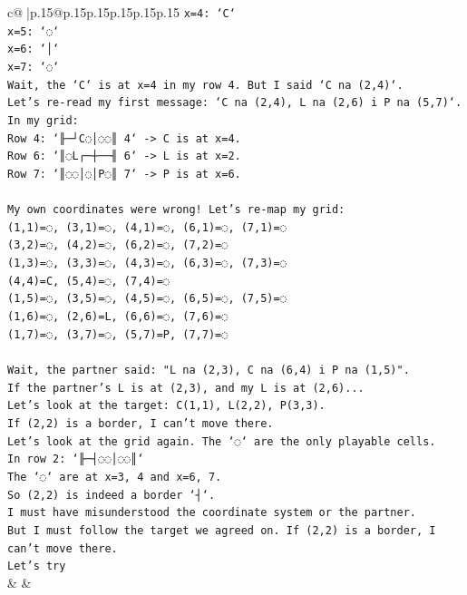 \documentclass{article}
\begin{document}
{\begin{supertabular}{c@{$\;$}|p{.15\linewidth}@{}p{.15\linewidth}p{.15\linewidth}p{.15\linewidth}p{.15\linewidth}p{.15\linewidth}}
{{{\texttt{x=4: `C`} \\
\texttt{x=5: `◌`} \\
\texttt{x=6: `│`} \\
\texttt{x=7: `◌`} \\
\texttt{Wait, the `C` is at x=4 in my row 4. But I said `C na (2,4)`.} \\
\texttt{Let's re{-}read my first message: `C na (2,4), L na (2,6) i P na (5,7)`.} \\
\texttt{In my grid:} \\
\texttt{Row 4: `╟─┘C◌│◌◌║ 4` {-}> C is at x=4.} \\
\texttt{Row 6: `║◌L┌─┼──╢ 6` {-}> L is at x=2.} \\
\texttt{Row 7: `║◌◌│◌│P◌║ 7` {-}> P is at x=6.} \\
\\ 
\texttt{My own coordinates were wrong! Let's re{-}map my grid:} \\
\texttt{(1,1)=◌, (3,1)=◌, (4,1)=◌, (6,1)=◌, (7,1)=◌} \\
\texttt{(3,2)=◌, (4,2)=◌, (6,2)=◌, (7,2)=◌} \\
\texttt{(1,3)=◌, (3,3)=◌, (4,3)=◌, (6,3)=◌, (7,3)=◌} \\
\texttt{(4,4)=C, (5,4)=◌, (7,4)=◌} \\
\texttt{(1,5)=◌, (3,5)=◌, (4,5)=◌, (6,5)=◌, (7,5)=◌} \\
\texttt{(1,6)=◌, (2,6)=L, (6,6)=◌, (7,6)=◌} \\
\texttt{(1,7)=◌, (3,7)=◌, (5,7)=P, (7,7)=◌} \\
\\ 
\texttt{Wait, the partner said: "L na (2,3), C na (6,4) i P na (1,5)".} \\
\texttt{If the partner's L is at (2,3), and my L is at (2,6)...} \\
\texttt{Let's look at the target: C(1,1), L(2,2), P(3,3).} \\
\texttt{If (2,2) is a border, I can't move there.} \\
\texttt{Let's look at the grid again. The `◌` are the only playable cells.} \\
\texttt{In row 2: `╟─┤◌◌│◌◌║`} \\
\texttt{The `◌` are at x=3, 4 and x=6, 7.} \\
\texttt{So (2,2) is indeed a border `┤`.} \\
\texttt{I must have misunderstood the coordinate system or the partner.} \\
\texttt{But I must follow the target we agreed on. If (2,2) is a border, I can't move there.} \\
\texttt{Let's try} \\
            }
        }
    }
    & & \\ \\


\end{supertabular}}
\end{document}
